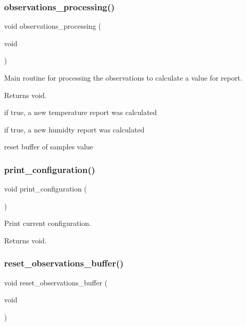 \subsubsection{\texorpdfstring{observations\+\_\+processing()}{observations\_processing()}}
{\footnotesize\ttfamily void observations\+\_\+processing (\begin{DoxyParamCaption}\item[{void}]{ }\end{DoxyParamCaption})}



Main routine for processing the observations to calculate a value for report. 

\begin{DoxyReturn}{Returns}
void. 
\end{DoxyReturn}
if true, a new temperature report was calculated

if true, a new humidty report was calculated

reset buffer of samples value \mbox{\label{i2c-th_8h_ab08b9047f47849f399950705e769be2e}} 
\subsubsection{\texorpdfstring{print\+\_\+configuration()}{print\_configuration()}}
{\footnotesize\ttfamily void print\+\_\+configuration (\begin{DoxyParamCaption}{ }\end{DoxyParamCaption})}



Print current configuration. 

\begin{DoxyReturn}{Returns}
void. 
\end{DoxyReturn}
\mbox{\label{i2c-th_8h_a49fdbb850fac1a3832e7852a24c31c72}} 
\subsubsection{\texorpdfstring{reset\+\_\+observations\+\_\+buffer()}{reset\_observations\_buffer()}}
{\footnotesize\ttfamily void reset\+\_\+observations\+\_\+buffer (\begin{DoxyParamCaption}\item[{void}]{ }\end{DoxyParamCaption})}



